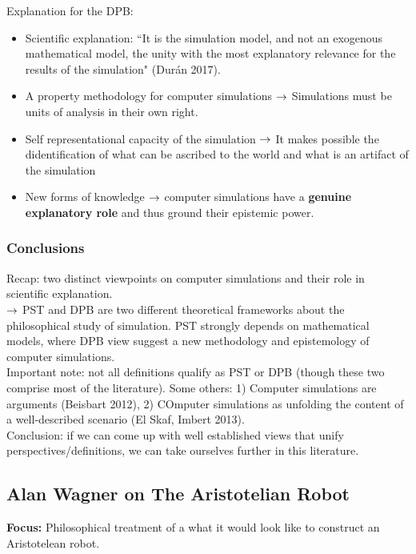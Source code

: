 Explanation for the DPB:
\begin{itemize}
	\item Scientific explanation: ``It is the simulation model, and not an exogenous mathematical model, the unity with the most explanatory relevance for the results of the simulation" (Dur{\' a}n 2017).
	\item A property methodology for computer simulations
	$\rightarrow$ Simulations must be units of analysis in their own right.
	\item Self representational capacity of the simulation
	$\rightarrow$ It makes possible the didentification of what can be ascribed to the world and what is an artifact of the simulation
	\item New forms of knowledge
	$\rightarrow$ computer simulations have a {\bf genuine explanatory role} and thus ground their epistemic power.
\end{itemize}


\subsubsection{Conclusions}

Recap: two distinct viewpoints on computer simulations and their role in scientific explanation. \\

$\rightarrow$ PST and DPB are two different theoretical frameworks about the philosophical study of simulation. PST strongly depends on mathematical models, where DPB view suggest a new methodology and epistemology of computer simulations. \\


Important note: not all definitions qualify as PST or DPB (though these two comprise most of the literature). Some others: 1) Computer simulations are arguments (Beisbart 2012), 2) COmputer simulations as unfolding the content of a well-described scenario (El Skaf, Imbert 2013). \\

Conclusion: if we can come up with well established views that unify perspectives/definitions, we can take ourselves further in this literature.

\spacerule

\subsection{Alan Wagner on The Aristotelian Robot}

{\bf Focus:} Philosophical treatment of a what it would look like to construct an Aristotelean robot. \\

